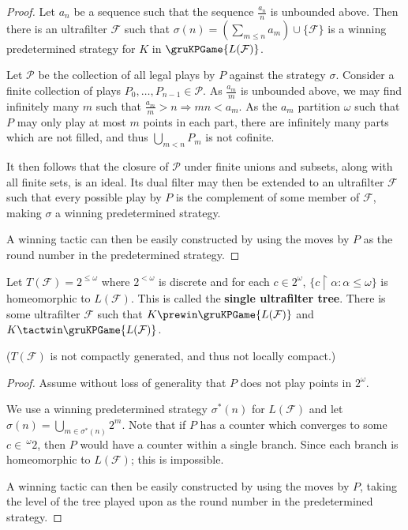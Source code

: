 \begin{proof}
Let $a_n$ be a sequence such that the sequence $\frac{a_n}{n}$ is unbounded above. Then there is an ultrafilter $\mathcal{F}$ such that $\sigma(n)=(\sum_{m\leq n} a_m )\cup \{\mathcal{F}\}$ is a winning predetermined strategy for $K$ in $\gruKPGame{L(\mathcal{F})}$.

Let $\mathcal{P}$ be the collection of all legal plays by $P$ against the strategy $\sigma$. Consider a finite collection of plays $P_0,\dots,P_{n-1}\in \mathcal{P}$. As $\frac{a_m}{m}$ is unbounded above, we may find infinitely many $m$ such that $\frac{a_m}{m}>n \Rightarrow mn<a_m$. As the $a_m$ partition $\omega$ such that $P$ may only play at most $m$ points in each part, there are infinitely many parts which are not filled, and thus $\bigcup_{m<n} P_m$ is not cofinite.

It then follows that the closure of $\mathcal{P}$ under finite unions and subsets, along with all finite sets, is an ideal. Its dual filter may then be extended to an ultrafilter $\mathcal{F}$ such that every possible play by $P$ is the complement of some member of $\mathcal{F}$, making $\sigma$ a winning predetermined strategy.

A winning tactic can then be easily constructed by using the moves by $P$ as the round number in the predetermined strategy.
\end{proof}

\begin{ex}
Let $T(\mathcal{F}) = 2^{\leq\omega}$ where $2^{<\omega}$ is discrete and for each $c\in 2^\omega$, $\{c \restriction \alpha : \alpha \leq \omega\}$ is homeomorphic to $L(\mathcal{F})$. This is called the \textbf{single ultrafilter tree}. There is some ultrafilter $\mathcal{F}$ such that $K \prewin \gruKPGame{L(\mathcal{F})}$ and $K \tactwin \gruKPGame{L(\mathcal{F})}$.

($T(\mathcal{F})$ is not compactly generated, and thus not locally compact.)
\end{ex}

\begin{proof}
Assume without loss of generality that $P$ does not play points in $2^\omega$.

We use a winning predetermined strategy $\sigma^*(n)$ for $L(\mathcal{F})$ and let $\sigma(n) = \bigcup_{m \in \sigma^*(n)} 2^m$. Note that if $P$ has a counter which converges to some $c\in \,^\omega2$, then $P$ would have a counter within a single branch. Since each branch is homeomorphic to $L(\mathcal{F})$; this is impossible.

A winning tactic can then be easily constructed by using the moves by $P$, taking the level of the tree played upon as the round number in the predetermined strategy.
\end{proof}

